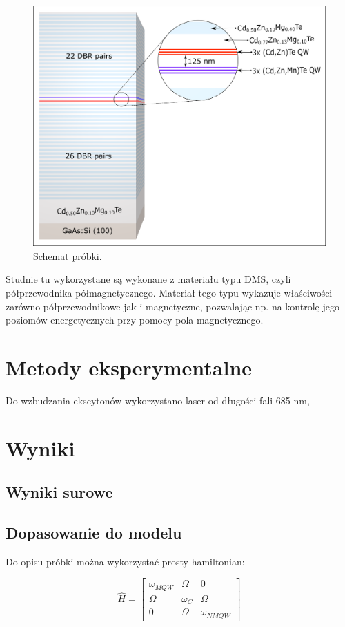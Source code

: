 \documentclass[licencjacka]{pracamgr}
\begin{document}
\begin{figure}[h!]
\includegraphics[width=13cm]{Probka.png} 
\centering
\caption{Schemat próbki.}
\end{figure}

Studnie tu wykorzystane są wykonane z materiału typu DMS, czyli półprzewodnika półmagnetycznego. Materiał tego typu wykazuje właściwości zarówno półprzewodnikowe jak i magnetyczne, pozwalając np. na kontrolę jego poziomów energetycznych przy pomocy pola magnetycznego.

\chapter{Metody eksperymentalne}\label{r:metody}
Do wzbudzania ekscytonów wykorzystano laser od długości fali 685 nm, 


\chapter{Wyniki}\label{r:wyniki}

\section{Wyniki surowe}

\section{Dopasowanie do modelu}
 Do opisu próbki można wykorzystać prosty hamiltonian:

\begin{equation}
\hat{H}=
\begin{bmatrix}
\omega_{MQW} & \Omega &0 \\
\Omega & \omega_{C} & \Omega \\
0 & \Omega & \omega_{NMQW}
\end{bmatrix}  
\end{equation}
\end{document}
